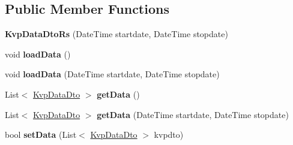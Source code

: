 \subsection*{Public Member Functions}
\begin{DoxyCompactItemize}
\item 
\mbox{\label{classkpi_mvc_api_1_1_data_transfer_objects_1_1_kvp_data_dto_rs_a4d9df8d729c0009c23968a0250d45dcc}} 
{\bfseries Kvp\+Data\+Dto\+Rs} (Date\+Time startdate, Date\+Time stopdate)
\item 
\mbox{\label{classkpi_mvc_api_1_1_data_transfer_objects_1_1_kvp_data_dto_rs_a562207c4315e1f552734257d994cc2d5}} 
void {\bfseries load\+Data} ()
\item 
\mbox{\label{classkpi_mvc_api_1_1_data_transfer_objects_1_1_kvp_data_dto_rs_afbda5e8db6a5f8b25125d2a6b6dcf7e1}} 
void {\bfseries load\+Data} (Date\+Time startdate, Date\+Time stopdate)
\item 
\mbox{\label{classkpi_mvc_api_1_1_data_transfer_objects_1_1_kvp_data_dto_rs_a895f4b97fb8c74c1a853145c03f5d393}} 
List$<$ \hyperlink{classkpi_mvc_api_1_1_data_transfer_objects_1_1_kvp_data_dto}{Kvp\+Data\+Dto} $>$ {\bfseries get\+Data} ()
\item 
\mbox{\label{classkpi_mvc_api_1_1_data_transfer_objects_1_1_kvp_data_dto_rs_ac6493e99d1c2fc236a25b61bc51014f9}} 
List$<$ \hyperlink{classkpi_mvc_api_1_1_data_transfer_objects_1_1_kvp_data_dto}{Kvp\+Data\+Dto} $>$ {\bfseries get\+Data} (Date\+Time startdate, Date\+Time stopdate)
\item 
\mbox{\label{classkpi_mvc_api_1_1_data_transfer_objects_1_1_kvp_data_dto_rs_aab05e9ab80b2e766a6744a200e4d8e91}} 
bool {\bfseries set\+Data} (List$<$ \hyperlink{classkpi_mvc_api_1_1_data_transfer_objects_1_1_kvp_data_dto}{Kvp\+Data\+Dto} $>$ kvpdto)
\item 
\mbox{\label{classkpi_mvc_api_1_1_data_transfer_objects_1_1_kvp_data_dto_rs_a9aa97ab6777b36a033c3662e86239e81}} 

\end{DoxyCompactItemize}
